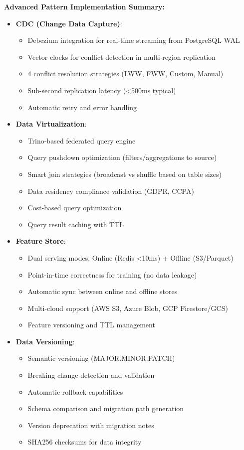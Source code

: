 \textbf{Advanced Pattern Implementation Summary:}

\begin{itemize}
    \item \textbf{CDC (Change Data Capture)}:
    \begin{itemize}
        \item Debezium integration for real-time streaming from PostgreSQL WAL
        \item Vector clocks for conflict detection in multi-region replication
        \item 4 conflict resolution strategies (LWW, FWW, Custom, Manual)
        \item Sub-second replication latency (<500ms typical)
        \item Automatic retry and error handling
    \end{itemize}

    \item \textbf{Data Virtualization}:
    \begin{itemize}
        \item Trino-based federated query engine
        \item Query pushdown optimization (filters/aggregations to source)
        \item Smart join strategies (broadcast vs shuffle based on table sizes)
        \item Data residency compliance validation (GDPR, CCPA)
        \item Cost-based query optimization
        \item Query result caching with TTL
    \end{itemize}

    \item \textbf{Feature Store}:
    \begin{itemize}
        \item Dual serving modes: Online (Redis <10ms) + Offline (S3/Parquet)
        \item Point-in-time correctness for training (no data leakage)
        \item Automatic sync between online and offline stores
        \item Multi-cloud support (AWS S3, Azure Blob, GCP Firestore/GCS)
        \item Feature versioning and TTL management
    \end{itemize}

    \item \textbf{Data Versioning}:
    \begin{itemize}
        \item Semantic versioning (MAJOR.MINOR.PATCH)
        \item Breaking change detection and validation
        \item Automatic rollback capabilities
        \item Schema comparison and migration path generation
        \item Version deprecation with migration notes
        \item SHA256 checksums for data integrity
    \end{itemize}
\end{itemize}

